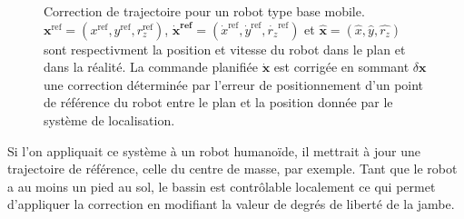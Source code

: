 \begin{figure}[ht!]
  \begin{center}
  \end{center}
  \caption{Correction de trajectoire pour un robot type base
    mobile. $\mathbf{x}^{\text{ref}} = (x^{\text{ref}},
    y^{\text{ref}}, r_z^{\text{ref}})$, $\mathbf{\dot{x}^{\text{ref}}}
    = (\dot{x}^{\text{ref}}, \dot{y}^{\text{ref}},
    \dot{r_z}^{\text{ref}})$ et $\mathbf{\hat{x}} = (\hat{x}, \hat{y},
    \hat{r_z})$ sont respectivment la position et vitesse du robot
    dans le plan et dans la réalité. La commande planifiée
    $\mathbf{\dot{x}}$ est corrigée en sommant $\delta \mathbf{x}$ une
    correction déterminée par l'erreur de positionnement d'un point de
    référence du robot entre le plan et la position donnée par le
    système de localisation. \label{fig:system}}
\end{figure}

Si l'on appliquait ce système à un robot humanoïde, il mettrait à jour
une trajectoire de référence, celle du centre de masse, par
exemple. Tant que le robot a au moins un pied au sol, le bassin est
contrôlable localement ce qui permet d'appliquer la correction en
modifiant la valeur de degrés de liberté de la jambe.


